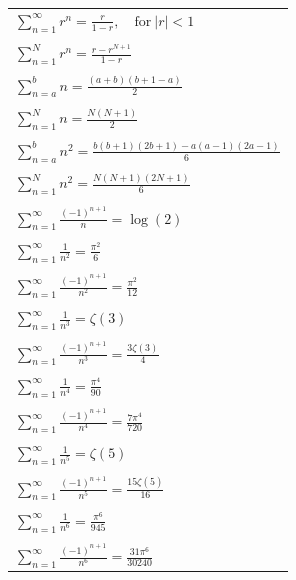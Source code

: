 \setlongtables
\begin{longtable}{l}
  $\displaystyle \sum_{n = 1}^\infty r^n = \frac{r}{1-r}, \quad \mathrm{for}\  |r| < 1$ \\
  \\
  $\displaystyle \sum_{n=1}^N r^n = \frac{r-r^{N+1}}{1-r}$ \\
  \\
  $\displaystyle \sum_{n=a}^b n = \frac{(a+b)(b+1-a)}{2}$ \\
  \\
  $\displaystyle \sum_{n=1}^N n = \frac{N(N+1)}{2}$ \\
  \\
  $\displaystyle \sum_{n=a}^b n^2 = \frac{b(b+1)(2b+1)-a(a-1)(2a-1)}{6}$ \\
  \\
  $\displaystyle \sum_{n=1}^N n^2 = \frac{N(N+1)(2N+1)}{6}$ \\
  \\
  $\displaystyle \sum_{n = 1}^\infty \frac{(-1)^{n+1}}{n} = \log(2)$ \\
  \\
  $\displaystyle \sum_{n = 1}^\infty \frac{1}{n^2} = \frac{\pi^2}{6}$ \\
  \\
  $\displaystyle \sum_{n = 1}^\infty \frac{(-1)^{n+1}}{n^2} = \frac{\pi^2}{12}$ \\
  \\
  $\displaystyle \sum_{n = 1}^\infty \frac{1}{n^3} = \zeta(3)$ \\
  \\
  $\displaystyle \sum_{n = 1}^\infty \frac{(-1)^{n+1}}{n^3} = \frac{3 \zeta(3)}{4}$ \\
  \\
  $\displaystyle \sum_{n = 1}^\infty \frac{1}{n^4} = \frac{\pi^4}{90}$ \\
  \\
  $\displaystyle \sum_{n = 1}^\infty \frac{(-1)^{n+1}}{n^4} = \frac{7 \pi^4}{720}$ \\
  \\
  $\displaystyle \sum_{n = 1}^\infty \frac{1}{n^5} = \zeta(5)$ \\
  \\
  $\displaystyle \sum_{n = 1}^\infty \frac{(-1)^{n+1}}{n^5} = \frac{15 \zeta(5)}{16}$ \\
  \\
  $\displaystyle \sum_{n = 1}^\infty \frac{1}{n^6} = \frac{\pi^6}{945}$ \\
  \\
  $\displaystyle \sum_{n = 1}^\infty \frac{(-1)^{n+1}}{n^6} = \frac{31 \pi^6}{30240}$
\end{longtable}








